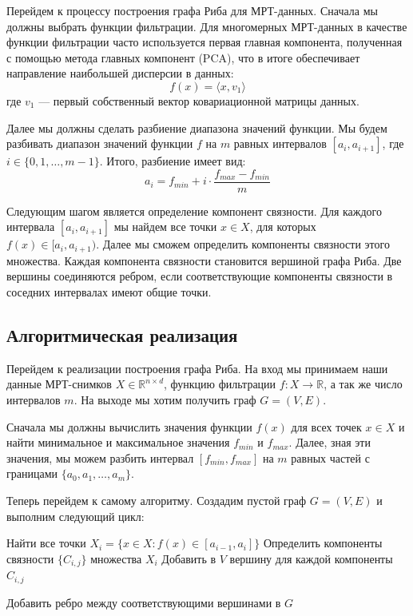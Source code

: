 \documentclass[a4paper,12pt]{extarticle}
\begin{document}
Перейдем к процессу построения графа Риба для МРТ-данных. Сначала мы должны выбрать функции фильтрации. Для многомерных МРТ-данных в качестве функции фильтрации часто используется первая главная компонента, полученная с помощью метода главных компонент (PCA), что в итоге обеспечивает направление наибольшей дисперсии в данных:
    \begin{equation}
        f(x) = \langle x, v_1 \rangle
    \end{equation}
    где $v_1$ — первый собственный вектор ковариационной матрицы данных.
    
Далее мы должны сделать разбиение диапазона значений функции. Мы будем разбивать диапазон значений функции $f$ на $m$ равных интервалов $[a_i, a_{i+1}]$, где $i \in \{0, 1, \ldots, m-1\}$. Итого, разбиение имеет вид:
    \begin{equation}
        a_i = f_{min} + i \cdot \frac{f_{max} - f_{min}}{m}
    \end{equation}
    
Следующим шагом является определение компонент связности. Для каждого интервала $[a_i, a_{i+1}]$ мы найдем все точки $x \in X$, для которых $f(x) \in [a_i, a_{i+1})$. Далее мы сможем определить компоненты связности этого множества. Каждая компонента связности становится вершиной графа Риба. Две вершины соединяются ребром, если соответствующие компоненты связности в соседних интервалах имеют общие точки.

\subsection{Алгоритмическая реализация}

Перейдем к реализации построения графа Риба. На вход мы принимаем наши данные МРТ-снимков $X \in \mathbb{R}^{n \times d}$, функцию фильтрации $f: X \rightarrow \mathbb{R}$, а так же число интервалов $m$. На выходе мы хотим получить граф $G = (V, E)$.

Сначала мы должны вычислить значения функции $f(x)$ для всех точек $x \in X$ и найти минимальное и максимальное значения $f_{min}$ и $f_{max}$. Далее, зная эти значения, мы можем разбить интервал $[f_{min}, f_{max}]$ на $m$ равных частей с границами $\{a_0, a_1, \ldots, a_m\}$.


Теперь перейдем к самому алгоритму. Создадим пустой граф $G = (V, E)$ и выполним следующий цикл:

\begin{algorithmic}
    \State Найти все точки $X_i = \{x \in X : f(x) \in [a_{i-1}, a_i]\}$
    \State Определить компоненты связности $\{C_{i,j}\}$ множества $X_i$
    \State Добавить в $V$ вершину для каждой компоненты $C_{i,j}$
\EndFor

            \State Добавить ребро между соответствующими вершинами в $G$
        \EndIf
    \EndFor
\EndFor
\end{algorithmic}
\end{document}
